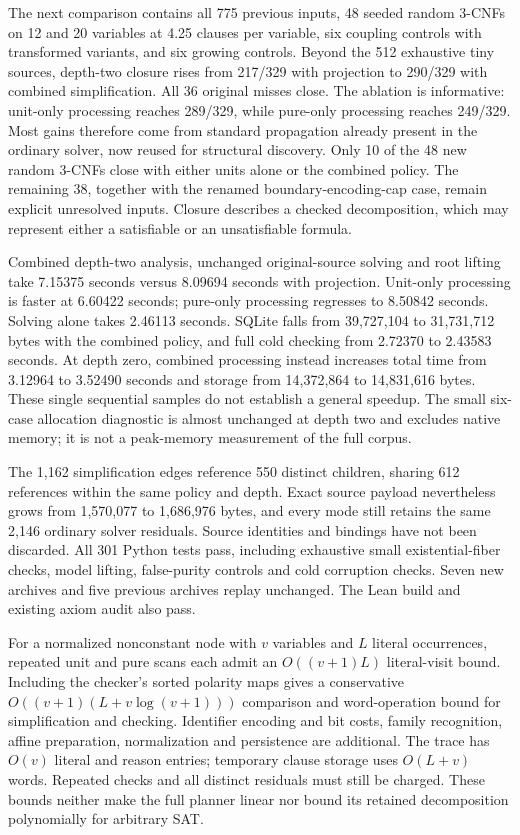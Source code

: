\documentclass[11pt,a4paper]{article}
\numberwithin{equation}{section}
\theoremstyle{plain}
\theoremstyle{definition}
\theoremstyle{remark}
\begin{document}
The next comparison contains all 775 previous inputs, 48 seeded random 3-CNFs on 12 and 20 variables at 4.25 clauses per variable, six coupling controls with transformed variants, and six growing controls. Beyond the 512 exhaustive tiny sources, depth-two closure rises from 217/329 with projection to 290/329 with combined simplification. All 36 original misses close. The ablation is informative: unit-only processing reaches 289/329, while pure-only processing reaches 249/329. Most gains therefore come from standard propagation already present in the ordinary solver, now reused for structural discovery. Only 10 of the 48 new random 3-CNFs close with either units alone or the combined policy. The remaining 38, together with the renamed boundary-encoding-cap case, remain explicit unresolved inputs. Closure describes a checked decomposition, which may represent either a satisfiable or an unsatisfiable formula.

Combined depth-two analysis, unchanged original-source solving and root lifting take 7.15375 seconds versus 8.09694 seconds with projection. Unit-only processing is faster at 6.60422 seconds; pure-only processing regresses to 8.50842 seconds. Solving alone takes 2.46113 seconds. SQLite falls from 39,727,104 to 31,731,712 bytes with the combined policy, and full cold checking from 2.72370 to 2.43583 seconds. At depth zero, combined processing instead increases total time from 3.12964 to 3.52490 seconds and storage from 14,372,864 to 14,831,616 bytes. These single sequential samples do not establish a general speedup. The small six-case allocation diagnostic is almost unchanged at depth two and excludes native memory; it is not a peak-memory measurement of the full corpus.

The 1,162 simplification edges reference 550 distinct children, sharing 612 references within the same policy and depth. Exact source payload nevertheless grows from 1,570,077 to 1,686,976 bytes, and every mode still retains the same 2,146 ordinary solver residuals. Source identities and bindings have not been discarded. All 301 Python tests pass, including exhaustive small existential-fiber checks, model lifting, false-purity controls and cold corruption checks. Seven new archives and five previous archives replay unchanged. The Lean build and existing axiom audit also pass.

For a normalized nonconstant node with $v$ variables and $L$ literal occurrences, repeated unit and pure scans each admit an $O((v+1)L)$ literal-visit bound. Including the checker's sorted polarity maps gives a conservative $O((v+1)(L+v\log(v+1)))$ comparison and word-operation bound for simplification and checking. Identifier encoding and bit costs, family recognition, affine preparation, normalization and persistence are additional. The trace has $O(v)$ literal and reason entries; temporary clause storage uses $O(L+v)$ words. Repeated checks and all distinct residuals must still be charged. These bounds neither make the full planner linear nor bound its retained decomposition polynomially for arbitrary SAT.
\end{document}
